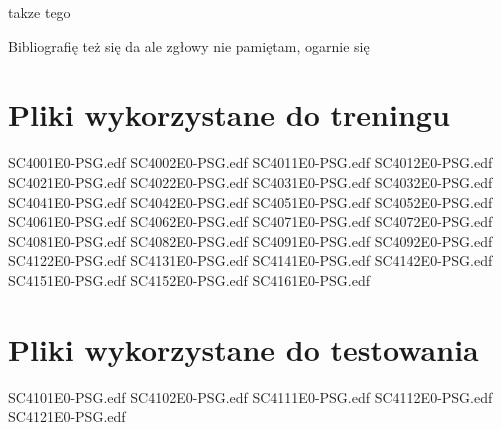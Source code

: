 \documentclass[12pt, notitlepage]{report}
\begin{document}
takze tego

Bibliografię też się da ale zgłowy nie pamiętam, ogarnie się


\begin{appendices}
    \chapter{Pliki wykorzystane do treningu}
    \label{appendix:A}
    SC4001E0-PSG.edf \newline
    SC4002E0-PSG.edf \newline
    SC4011E0-PSG.edf \newline
    SC4012E0-PSG.edf \newline
    SC4021E0-PSG.edf \newline
    SC4022E0-PSG.edf \newline
    SC4031E0-PSG.edf \newline
    SC4032E0-PSG.edf \newline
    SC4041E0-PSG.edf \newline
    SC4042E0-PSG.edf \newline
    SC4051E0-PSG.edf \newline
    SC4052E0-PSG.edf \newline
    SC4061E0-PSG.edf \newline
    SC4062E0-PSG.edf \newline
    SC4071E0-PSG.edf \newline
    SC4072E0-PSG.edf \newline
    SC4081E0-PSG.edf \newline
    SC4082E0-PSG.edf \newline
    SC4091E0-PSG.edf \newline
    SC4092E0-PSG.edf \newline
    SC4122E0-PSG.edf \newline
    SC4131E0-PSG.edf \newline
    SC4141E0-PSG.edf \newline
    SC4142E0-PSG.edf \newline
    SC4151E0-PSG.edf \newline
    SC4152E0-PSG.edf \newline
    SC4161E0-PSG.edf

    \chapter{Pliki wykorzystane do testowania}
    \label{appendix:B}
    SC4101E0-PSG.edf \newline
    SC4102E0-PSG.edf \newline
    SC4111E0-PSG.edf \newline
    SC4112E0-PSG.edf \newline
    SC4121E0-PSG.edf

\end{appendices}
\end{document}
